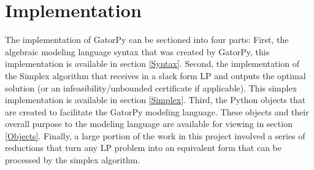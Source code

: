 \documentclass[conference]{IEEEtran}
\begin{document}
\section{Implementation}
\label{sse:implementation}
The implementation of GatorPy can be sectioned into four parts:
First, the algebraic modeling language syntax that was created by GatorPy, this implementation is available in section \ref{Syntax}.
Second, the implementation of the Simplex algorithm that receives in a slack form LP and outputs the optimal solution (or an infeasibility/unbounded certificate if applicable).
This simplex implementation is available in section \ref{Simplex}.
Third, the Python objects that are created to facilitate the GatorPy modeling language.
These objects and their overall purpose to the modeling language are available for viewing in section \ref{Objects}.
Finally, a large portion of the work in this project involved a series of reductions that turn any LP problem into an equivalent form that can be processed by the simplex algorithm.
\end{document}
